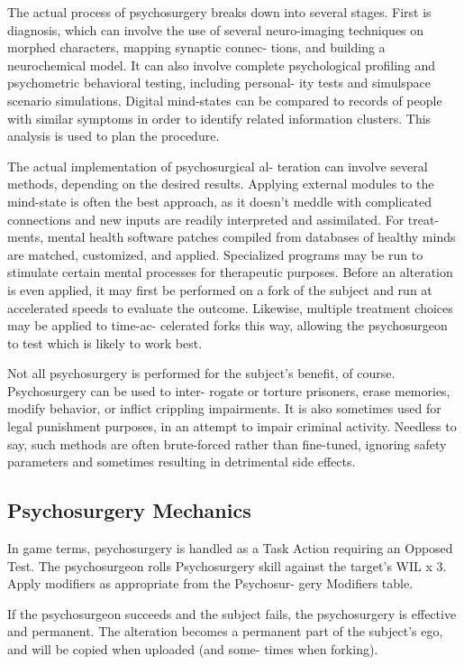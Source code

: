 The actual process of psychosurgery breaks down 
into several stages. First is diagnosis, which can 
involve the use of several neuro-imaging techniques 
on morphed characters, mapping synaptic connec-
tions, and building a neurochemical model. It can 
also involve complete psychological profiling  and 
psychometric behavioral testing, including personal-
ity tests and simulspace scenario simulations. Digital 
mind-states can be compared to records of people 
with similar symptoms in order to identify related 
information clusters. This analysis is used to plan 
the procedure.

The actual implementation of psychosurgical al-
teration can involve several methods, depending on 
the desired results. Applying external modules to the 
mind-state is often the best approach, as it doesn't 
meddle with complicated connections and new inputs 
are readily interpreted and assimilated. For treat-
ments, mental health software patches compiled from 
databases of healthy minds are matched, customized, 
and applied. Specialized programs may be run to 
stimulate certain mental processes for therapeutic 
purposes. Before an alteration is even applied, it may 
first be performed on a fork of the subject and run at 
accelerated speeds to evaluate the outcome. Likewise, 
multiple treatment choices may be applied to time-ac-
celerated forks this way, allowing the psychosurgeon 
to test which is likely to work best.

Not all psychosurgery is performed for the subject's 
benefit, of course. Psychosurgery can be used to inter-
rogate or torture prisoners, erase memories, modify 
behavior, or inflict crippling impairments. It is also 
sometimes used for legal punishment purposes, in 
an attempt to impair criminal activity. Needless to 
say, such methods are often brute-forced rather than 
fine-tuned, ignoring safety parameters and sometimes 
resulting in detrimental side effects.

\subsection{Psychosurgery Mechanics}

In game terms, psychosurgery is handled as a Task 
Action requiring an Opposed Test. The psychosurgeon 
rolls Psychosurgery skill against the target's WIL x 3. 
Apply modifiers as appropriate from the Psychosur-
gery Modifiers table.

If the psychosurgeon succeeds and the subject fails, 
the psychosurgery is effective and permanent. The 
alteration becomes a permanent part of the subject's 
ego, and will be copied when uploaded (and some-
times when forking).


